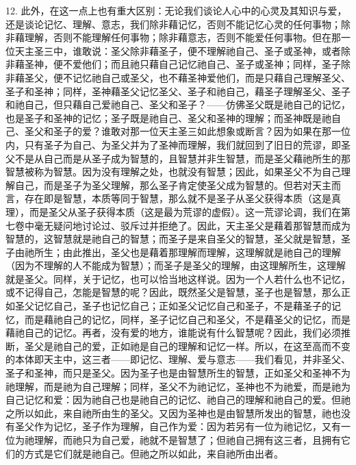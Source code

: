 12. 此外，在这一点上也有重大区别：无论我们谈论人心中的心灵及其知识与爱，还是谈论记忆、理解、意志，我们除非藉记忆，否则不能记忆心灵的任何事物；除非藉理解，否则不能理解任何事物；除非藉意志，否则不能爱任何事物。但在那一位天主圣三中，谁敢说：圣父除非藉圣子，便不理解祂自己、圣子或圣神，或者除非藉圣神，便不爱他们；而且祂只藉自己记忆祂自己、圣子或圣神；同样，圣子除非藉圣父，便不记忆祂自己或圣父，也不藉圣神爱他们，而是只藉自己理解圣父、圣子和圣神；同样，圣神藉圣父记忆圣父、圣子和祂自己，藉圣子理解圣父、圣子和祂自己，但只藉自己爱祂自己、圣父和圣子？——仿佛圣父既是祂自己的记忆，也是圣子和圣神的记忆；圣子既是祂自己、圣父和圣神的理解；而圣神既是祂自己、圣父和圣子的爱？谁敢对那一位天主圣三如此想象或断言？因为如果在那一位内，只有圣子为自己、为圣父并为了圣神而理解，我们就回到了旧日的荒谬，即圣父不是从自己而是从圣子成为智慧的，且智慧并非生智慧，而是圣父藉祂所生的那智慧被称为智慧。因为没有理解之处，也就没有智慧；因此，如果圣父不为自己理解自己，而是圣子为圣父理解，那么圣子肯定使圣父成为智慧的。但若对天主而言，存在即是智慧，本质等同于智慧，那么就不是圣子从圣父获得本质（这是真理），而是圣父从圣子获得本质（这是最为荒谬的虚假）。这一荒谬论调，我们在第七卷中毫无疑问地讨论过、驳斥过并拒绝了。因此，天主圣父是藉着那智慧而成为智慧的，这智慧就是祂自己的智慧；而圣子是来自圣父的智慧，圣父就是智慧，圣子由祂所生；由此推出，圣父也是藉着那理解而理解，这理解就是祂自己的理解（因为不理解的人不能成为智慧）；而圣子是圣父的理解，由这理解所生，这理解就是圣父。同样，关于记忆，也可以恰当地这样说。因为一个人若什么也不记忆，或不记得自己，怎能是智慧的呢？因此，既然圣父是智慧，圣子也是智慧，那么正如圣父记忆自己，圣子也记忆自己；正如圣父记忆自己和圣子，不是藉圣子的记忆，而是藉祂自己的记忆，同样，圣子记忆自己和圣父，不是藉圣父的记忆，而是藉祂自己的记忆。再者，没有爱的地方，谁能说有什么智慧呢？因此，我们必须推断，圣父是祂自己的爱，正如祂是自己的理解和记忆一样。所以，在这至高而不变的本体即天主中，这三者——即记忆、理解、爱与意志——我们看见，并非圣父、圣子和圣神，而只是圣父。因为圣子也是由智慧所生的智慧，正如圣父和圣神不为祂理解，而是祂为自己理解；同样，圣父不为祂记忆，圣神也不为祂爱，而是祂为自己记忆和爱：因为祂自己也是祂自己的记忆、祂自己的理解和祂自己的爱。但祂之所以如此，来自祂所由生的圣父。又因为圣神也是由智慧所发出的智慧，祂也没有圣父作为记忆，圣子作为理解，自己作为爱：因为若另有一位为祂记忆，又有一位为祂理解，而祂只为自己爱，祂就不是智慧了；但祂自己拥有这三者，且拥有它们的方式是它们就是祂自己。但祂之所以如此，来自祂所由出者。\par

